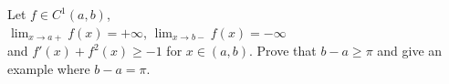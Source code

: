 \documentclass{article}
\begin{document}
	\setlength{\parindent}{0pt}
	Let $f\in C^1(a, b)$,\\
	$\lim_{x\to a+}f(x) = +\infty$,	$\lim_{x\to b-}f(x) = -\infty$\\
	and $f'(x)+f^2(x)\geq -1$ for $x \in (a, b)$. Prove that $b-a\geq\pi$ and give an example
	where $b-a=\pi$.
\end{document}
